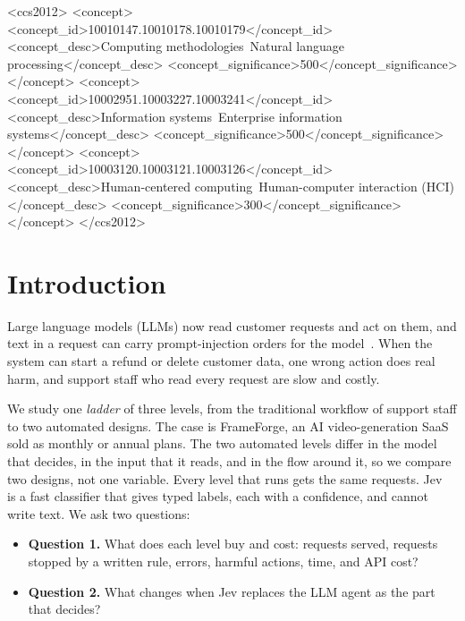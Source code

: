 \documentclass[sigconf,nonacm]{acmart}
\begin{document}
\begin{CCSXML}
<ccs2012>
   <concept>
       <concept_id>10010147.10010178.10010179</concept_id>
       <concept_desc>Computing methodologies~Natural language processing</concept_desc>
       <concept_significance>500</concept_significance>
   </concept>
   <concept>
       <concept_id>10002951.10003227.10003241</concept_id>
       <concept_desc>Information systems~Enterprise information systems</concept_desc>
       <concept_significance>500</concept_significance>
   </concept>
   <concept>
       <concept_id>10003120.10003121.10003126</concept_id>
       <concept_desc>Human-centered computing~Human-computer interaction (HCI)</concept_desc>
       <concept_significance>300</concept_significance>
   </concept>
</ccs2012>
\end{CCSXML}



\maketitle
\pagestyle{empty}
\thispagestyle{empty}


\section{Introduction}

Large language models (LLMs) now read customer requests and act on them, and text in a request can carry prompt-injection orders for the model~\cite{greshake2023injection}. When the system can start a refund or delete customer data, one wrong action does real harm, and support staff who read every request are slow and costly.

We study one \emph{ladder} of three levels, from the traditional workflow of support staff to two automated designs. The case is FrameForge, an AI video-generation SaaS sold as monthly or annual plans. The two automated levels differ in the model that decides, in the input that it reads, and in the flow around it, so we compare two designs, not one variable. Every level that runs gets the same requests. Jev~\cite{almeida2026jev} is a fast classifier that gives typed labels, each with a confidence, and cannot write text. We ask two questions:
\begin{itemize}
    \item \textbf{Question 1.} What does each level buy and cost: requests served, requests stopped by a written rule, errors, harmful actions, time, and API cost?
    \item \textbf{Question 2.} What changes when Jev replaces the LLM agent as the part that decides?
\end{itemize}
\end{document}
